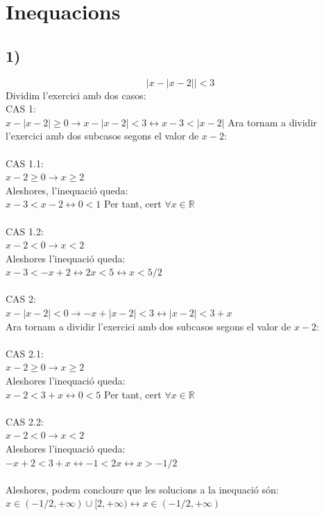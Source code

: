 \section*{Inequacions}
\subsection*{1)}
$$|x-|x-2||<3$$
Dividim l'exercici amb dos casos:\\
CAS 1:\\ 
$x-|x-2|\geq0 \rightarrow x-|x-2|<3 \leftrightarrow x-3<|x-2|$
Ara tornam a dividir l'exercici amb dos subcasos segons el valor de $x-2$:\\
\\
CAS 1.1:\\
$x-2\geq0 \rightarrow x\geq2$\\
Aleshores, l'inequació queda:\\
$x-3 < x-2 \leftrightarrow 0<1$ Per tant, cert $\forall x \in \mathbb{R}$\\
\\
CAS 1.2:\\
$x-2<0 \rightarrow x<2$\\
Aleshores l'inequació queda:\\
$x-3<-x+2 \leftrightarrow 2x<5 \leftrightarrow x<5/2$\\
\\
CAS 2:\\
$x-|x-2|<0 \rightarrow -x+|x-2|<3 \leftrightarrow |x-2|<3+x$\\
Ara tornam a dividir l'exercici amb dos subcasos segons el valor de $x-2$:\\
\\
CAS 2.1:\\
$x-2\geq0 \rightarrow x\geq2$\\
Aleshores l'inequació queda:\\
$x-2<3+x \leftrightarrow 0<5$ Per tant, cert $\forall x \in \mathbb{R}$\\
\\
CAS 2.2:\\
$x-2<0 \rightarrow x<2$\\
Aleshores l'inequació queda:\\
$-x+2<3+x \leftrightarrow -1<2x \leftrightarrow x>-1/2$\\
\\
Aleshores, podem concloure que les solucions a la inequació són:\\
$x \in (-1/2,+\infty) \cup [2,+\infty) \leftrightarrow x \in (-1/2,+\infty)$\\
